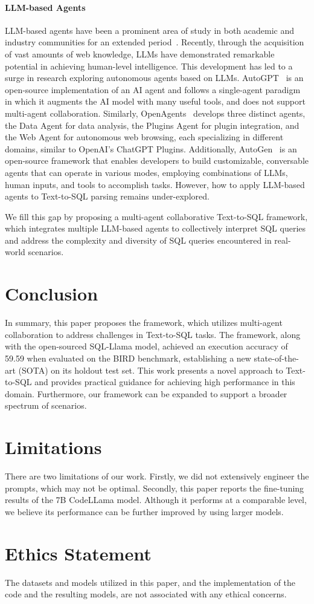 \paragraph{LLM-based Agents} LLM-based agents have been a prominent area of study in both academic and industry communities for an extended period~\citep{wang2023survey}. 
Recently, through the acquisition of vast amounts of web knowledge, LLMs have demonstrated remarkable potential in achieving human-level intelligence. 
This development has led to a surge in research exploring autonomous agents based on LLMs.
AutoGPT~\citep{autogpt2023} is an open-source implementation of an AI agent and follows a single-agent paradigm in which it augments the AI model with many useful tools, and does not support multi-agent collaboration.
Similarly, OpenAgents~\citep{OpenAgents} develops three distinct agents, the Data Agent for data analysis, the Plugins Agent for plugin integration, and the Web Agent for autonomous web browsing, each specializing in different domains, similar to OpenAI's ChatGPT Plugins.
Additionally, AutoGen~\citep{wu2023autogen} is an open-source framework that enables developers to build customizable, conversable agents that can operate in various modes, employing combinations of LLMs, human inputs, and tools to accomplish tasks.
However, how to apply LLM-based agents to Text-to-SQL parsing remains under-explored.

We fill this gap by proposing a multi-agent collaborative Text-to-SQL framework, which integrates multiple LLM-based agents to collectively interpret SQL queries and address the complexity and diversity of SQL queries encountered in real-world scenarios.

\section{Conclusion}
In summary, this paper proposes the \ours{} framework, which utilizes multi-agent collaboration to address challenges in Text-to-SQL tasks. 
The framework, along with the open-sourced SQL-Llama model, achieved an execution accuracy of 59.59 when evaluated on the BIRD benchmark, establishing a new state-of-the-art (SOTA) on its holdout test set. 
This work presents a novel approach to Text-to-SQL and provides practical guidance for achieving high performance in this domain.
Furthermore, our framework can be expanded to support a broader spectrum of scenarios.

\section*{Limitations}
There are two limitations of our work. Firstly, we did not extensively engineer the prompts, which may not be optimal. Secondly, this paper reports the fine-tuning results of the 7B CodeLLama model. Although it performs at a comparable level, we believe its performance can be further improved by using larger models.

\section*{Ethics Statement}
The datasets and models utilized in this paper, and the implementation of the code and the resulting models, are not associated with any ethical concerns.

\clearpage

